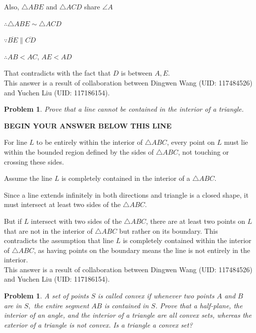 \documentclass[letter,12pt]{article}
\newtheorem{problem}[main_theorem]{Problem}
\newcommand{\answerspacetop}{
	\begin{center}
		\textbf{BEGIN YOUR ANSWER BELOW THIS LINE} \\ \hrulefill
	\end{center}
}
\begin{document}
Also, $\triangle ABE$ and $\triangle ACD$ share $\angle A$

$\therefore \triangle ABE \sim \triangle ACD$

$\because\overline{BE} \parallel \overline{CD}$

$\therefore AB < AC$, $AE < AD$

That contradicts with the fact that $D$ is between $A, E$.\\

This answer is a result of collaboration between Dingwen Wang (UID: 117484526) and Yuchen Liu (UID: 117186154).

\pagebreak


\begin{problem}
Prove that a line cannot be contained in the interior of a triangle.
\end{problem}

\answerspacetop

For line $L$ to be entirely within the interior of $\triangle ABC$, every point on $L$ must lie within the bounded region defined by the sides of $\triangle ABC$, not touching or crossing these sides.

Assume the line $L$ is completely contained in the interior of a $\triangle ABC$.

Since a line extends infinitely in both directions and triangle is a closed shape, it must intersect at least two sides of the $\triangle ABC$. 

But if $L$ intersect with two sides of the $\triangle ABC$, there are at least two points on $L$ that are not in the interior of $\triangle ABC$ but rather on its boundary. This contradicts the assumption that line $L$ is completely contained within the interior of $\triangle ABC$, as having points on the boundary means the line is not entirely in the interior.\\

This answer is a result of collaboration between Dingwen Wang (UID: 117484526) and Yuchen Liu (UID: 117186154).

\pagebreak

\begin{problem}
    A set of points $S$ is called convex if whenever two points $A$ and $B$ are in $S,$
the entire segment $AB$ is contained in $S$. Prove that a half-plane, the
interior of an angle, and the interior of a triangle are all convex sets,
whereas the exterior of a triangle is not convex. Is a triangle a convex set?
\end{problem}
\end{document}
